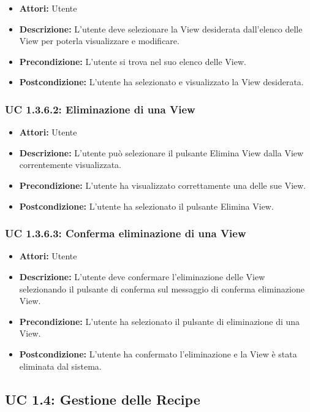 \begin{itemize}
    \item \textbf{Attori:} Utente
    \item \textbf{Descrizione:} L'utente deve selezionare la View desiderata dall'elenco delle View per poterla visualizzare e modificare.
    \item \textbf{Precondizione:} L'utente si trova nel suo elenco delle View.
    \item \textbf{Postcondizione:} L'utente ha selezionato e visualizzato la View desiderata.
\end{itemize}

\subsubsection{UC 1.3.6.2: Eliminazione di una View}

\begin{itemize}
    \item \textbf{Attori:} Utente
    \item \textbf{Descrizione:} L'utente può selezionare il pulsante Elimina View dalla View correntemente visualizzata.
    \item \textbf{Precondizione:} L'utente ha visualizzato correttamente una delle sue View.
    \item \textbf{Postcondizione:} L'utente ha selezionato il pulsante Elimina View.
\end{itemize}

\subsubsection{UC 1.3.6.3: Conferma eliminazione di una View}

\begin{itemize}
    \item \textbf{Attori:} Utente
    \item \textbf{Descrizione:} L'utente deve confermare l'eliminazione delle View selezionando il pulsante di conferma sul messaggio di conferma eliminazione View.
    \item \textbf{Precondizione:} L'utente ha selezionato il pulsante di eliminazione di una View.
    \item \textbf{Postcondizione:} L'utente ha confermato l'eliminazione e la View è stata eliminata dal sistema.
\end{itemize}

\clearpage


\subsection{UC 1.4: Gestione delle Recipe}

